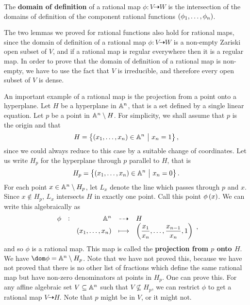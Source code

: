 \begin{definition*}
The \textbf{domain of definition} of a rational map $ \phi : V \dashrightarrow W $ is the intersection of the domains of definition of the component rational functions $ \br{\phi_1, \dots, \phi_n} $.
\end{definition*}

The two lemmas we proved for rational functions also hold for rational maps, since the domain of definition of a rational map $ \phi : V \dashrightarrow W $ is a non-empty Zariski open subset of $ V $, and if a rational map is regular everywhere then it is a regular map. In order to prove that the domain of definition of a rational map is non-empty, we have to use the fact that $ V $ is irreducible, and therefore every open subset of $ V $ is dense.

\begin{example*}
An important example of a rational map is the projection from a point onto a hyperplane. Let $ H $ be a hyperplane in $ \AA^n $, that is a set defined by a single linear equation. Let $ p $ be a point in $ \AA^n \setminus H $. For simplicity, we shall assume that $ p $ is the origin and that
$$ H = \cbr{\br{x_1, \dots, x_n} \in \AA^n \st x_n = 1}, $$
since we could always reduce to this case by a suitable change of coordinates. Let us write $ H_p $ for the hyperplane through $ p $ parallel to $ H $, that is
$$ H_p = \cbr{\br{x_1, \dots, x_n} \in \AA^n \st x_n = 0}. $$
For each point $ x \in \AA^n \setminus H_p $, let $ L_x $ denote the line which passes through $ p $ and $ x $. Since $ x \notin H_p $, $ L_x $ intersects $ H $ in exactly one point. Call this point $ \phi\br{x} $. We can write this algebraically as
$$ \rational[\phi]{\AA^n}{H}{\br{x_1, \dots, x_n}}{\br{\dfrac{x_1}{x_n}, \dots, \dfrac{x_{n - 1}}{x_n}, 1}}, $$
and so $ \phi $ is a rational map. This map is called the \textbf{projection from $ p $ onto $ H $}. We have $ \dom \phi = \AA^n \setminus H_p $. Note that we have not proved this, because we have not proved that there is no other list of fractions which define the same rational map but have non-zero denominators at points in $ H_p $. One can prove this. For any affine algebraic set $ V \subseteq \AA^n $ such that $ V \not\subseteq H_p $, we can restrict $ \phi $ to get a rational map $ V \dashrightarrow H $. Note that $ p $ might be in $ V $, or it might not.
\end{example*}

\pagebreak

